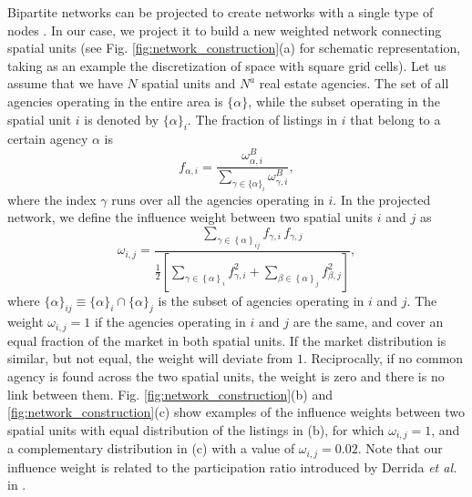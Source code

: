 Bipartite networks can be projected to create networks with a single type of nodes \cite{newman2001structure,newman2001scientific,zhou2007bipartite}. In our case, we project it to build a new weighted network connecting spatial units (see Fig. \ref{fig:network_construction}(a) for schematic representation, taking as an example the discretization of space with square grid cells). Let us assume that we have $N$ spatial units and $N^a$ real estate agencies. The set of all agencies operating in the entire area is $\{ \alpha \}$, while the subset operating in the spatial unit $i$ is denoted by $\{ \alpha \}_i$. The fraction of listings in $i$ that belong to a certain agency $\alpha$ is
\begin{equation}
    f_{\alpha, i} = \frac{\omega^{B}_{\alpha, i}}{\sum_{\gamma \in \{ \alpha \}_i} \omega^{B}_{\gamma, i}},
\end{equation}
where the index $\gamma$ runs over all the agencies operating in $i$. In the projected network, we define the influence weight between two spatial units $i$ and $j$ as
\begin{equation}
\omega_{i,j} = \frac{\sum_{\gamma \in \left\{ \alpha \right\}_{ij}} f_{\gamma,i} \, f_{\gamma,j}}{ \frac{1}{2} \left[ \sum_{\gamma \in \left\{ \alpha \right\}_{i}} f^2_{\gamma, i} + \sum_{\beta \in \left\{ \alpha \right\}_{j}} f^2_{\beta, j} \right]},
\label{eq:weight_eq}
\end{equation}
where $\{ \alpha \}_{ij} \equiv \{\alpha\}_i \cap \{\alpha\}_j$ is the subset of agencies operating in $i$ and $j$. The weight $\omega_{i,j} =1 $ if the agencies operating in $i$ and $j$ are the same, and cover an equal fraction of the market in both spatial units. If the market distribution is similar, but not equal, the weight will deviate from $1$. Reciprocally, if no common agency is found across the two spatial units, the weight is zero and there is no link between them. Fig. \ref{fig:network_construction}(b) and \ref{fig:network_construction}(c) show examples of the influence weights between two spatial units with equal distribution of the listings in (b), for which $\omega_{i,j} =1 $, and a complementary distribution in (c) with a value of $\omega_{i,j} = 0.02$. Note that our influence weight is related to the participation ratio introduced by Derrida \textit{et al.} in \cite{Derrida_1987}. 

